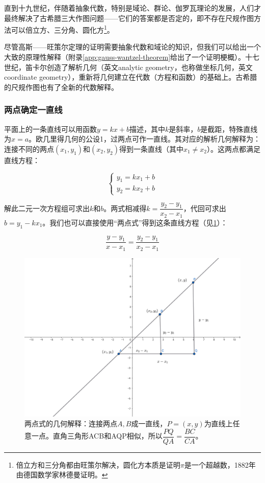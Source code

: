 \documentclass[b5paper]{ctexart}
\begin{document}
直到十九世纪，伴随着抽象代数，特别是域论、群论、伽罗瓦理论的发展，人们才最终解决了古希腊三大作图问题——它们的答案都是否定的，即不存在尺规作图方法可以倍立方、三分角、圆化方\footnote{倍立方和三分角都由旺策尔解决，圆化方本质是证明$\pi$是一个超越数，1882年由德国数学家林德曼证明。}。

尽管高斯——旺策尔定理的证明需要抽象代数和域论的知识，但我们可以给出一个大致的原理性解释（附录\ref{app:gauss-wantzel-theorem}给出了一个证明梗概）。十七世纪，笛卡尔创造了解析几何（英文analytic geometry，也称做坐标几何，英文coordinate geometry），重新将几何建立在代数（方程和函数）的基础上。古希腊的尺规作图也有了全新的代数解释。

\subsubsection{两点确定一直线}
平面上的一条直线可以用函数$y = kx + b$描述，其中$k$是斜率，$b$是截距，特殊直线为$x = a$。欧几里得几何的公设1，过两点可作一直线。其对应的解析几何解释为：连接不同的两点$(x_1, y_1)$和$(x_2, y_2)$得到一条直线（其中$x_1 \ne x_2$）。这两点都满足直线方程：

\[
\begin{cases}
y_1 = k x_1 + b \\
y_2 = k x_2 + b
\end{cases}
\]

解此二元一次方程组可求出$k$和$b$。两式相减得$k = \dfrac{y_2 - y_1}{x_2 - x_1}$，代回可求出$b = y_1 - k x_1$。我们也可以直接使用“两点式”得到这条直线方程（见\cref{fig:line2p}）：

\[
\frac{y - y_1}{x - x_1} = \frac{y_2 - y_1}{x_2 - x_1}
\]

\begin{figure}[htbp]
 \centering
 \includegraphics[scale=0.35]{img/line2p}
 \caption{两点式的几何解释：连接两点$A, B$成一直线，$P = (x, y)$为直线上任意一点。直角三角形ACB和AQP相似，所以$\dfrac{PQ}{QA} = \dfrac{BC}{CA}$。}
 \label{fig:line2p}
\end{figure}
\end{document}
